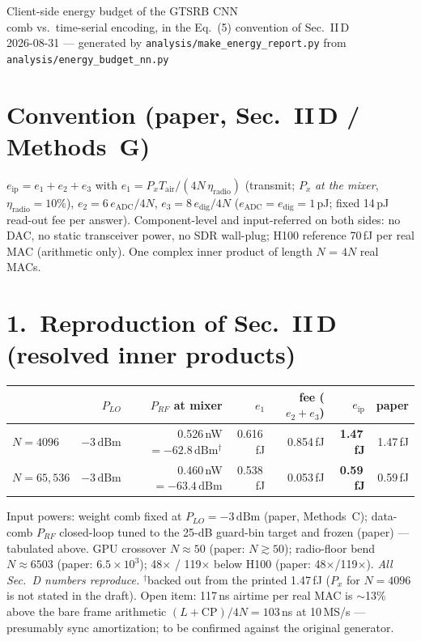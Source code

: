 \documentclass[11pt]{article}
\newcommand{\dbm}{\,\mathrm{dBm}}
\begin{document}
\begin{center}
{\LARGE Client-side energy budget of the GTSRB CNN}\\[2mm]
{\large comb vs.\ time-serial encoding, in the Eq.~(5) convention of
Sec.~II\,D}\\[1mm]
2026-08-31 --- generated by \texttt{analysis/make\_energy\_report.py}
from \texttt{analysis/energy\_budget\_nn.py}
\end{center}

\section*{Convention (paper, Sec.~II\,D / Methods~G)}
$e_{\mathrm{ip}} = e_1+e_2+e_3$ with
$e_1 = P_x T_{\mathrm{air}}/(4N\,\eta_{\mathrm{radio}})$ (transmit; $P_x$
\emph{at the mixer}, $\eta_{\mathrm{radio}}=10\%$),
$e_2 = 6\,e_{\mathrm{ADC}}/4N$, $e_3 = 8\,e_{\mathrm{dig}}/4N$
($e_{\mathrm{ADC}}=e_{\mathrm{dig}}=1$\,pJ; fixed 14\,pJ read-out fee per
answer). Component-level and input-referred on both sides: no DAC, no static
transceiver power, no SDR wall-plug; H100 reference 70\,fJ per real MAC
(arithmetic only). One complex inner product of length $N$ = $4N$ real MACs.

\section*{1.\ Reproduction of Sec.~II\,D (resolved inner products)}
\begin{center}\begin{tabular}{lrrrrrr}
\toprule
 & $P_{LO}$ & $P_{RF}$ at mixer & $e_1$ & fee ($e_2{+}e_3$) &
$e_{\mathrm{ip}}$ & paper\\
\midrule
$N=4096$  & $-3\dbm$ & 0.526\,nW $=-62.8\dbm$$^{\dagger}$ &
0.616\,fJ & 0.854\,fJ & \textbf{1.47\,fJ} & 1.47\,fJ\\
$N=65{,}536$ & $-3\dbm$ & 0.460\,nW $=-63.4\dbm$ &
0.538\,fJ & 0.053\,fJ & \textbf{0.59\,fJ} & 0.59\,fJ\\
\bottomrule
\end{tabular}\end{center}
Input powers: weight comb fixed at $P_{LO}=-3\dbm$ (paper, Methods~C);
data-comb $P_{RF}$ closed-loop tuned to the 25-dB guard-bin target and
frozen (paper) --- tabulated above.
GPU crossover $N\!\approx\!50$ (paper: $N\gtrsim50$);
radio-floor bend $N\!\approx\!6503$ (paper: $6.5\times10^3$);
48$\times$ / 119$\times$ below H100 (paper: 48$\times$/119$\times$).
\emph{All Sec.~D numbers reproduce.}
$^{\dagger}$backed out from the printed 1.47\,fJ ($P_x$ for $N{=}4096$ is not
stated in the draft). Open item: 117\,ns airtime per real MAC is $\sim$13\%
above the bare frame arithmetic $(L{+}\mathrm{CP})/4N = 103$\,ns at
10\,MS/s --- presumably sync amortization; to be confirmed against the
original generator.
\end{document}
